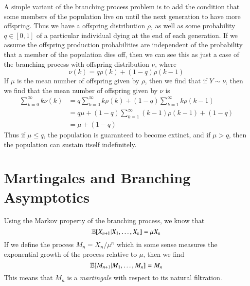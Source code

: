 \begin{example}
    A simple variant of the branching process problem is to add the condition that some members of the population live on until the next generation to have more offspring. Thus we have a offspring distribution $\rho$, as well as some probability $q \in [0,1]$ of a particular individual dying at the end of each generation. If we assume the offspring production probabilities are independent of the probability that a member of the population dies off, then we can see this as just a case of the branching process with offspring distribution $\nu$, where
    \[ \nu(k) = q\rho(k) + (1 - q)\rho(k-1) \]
    If $\mu$ is the mean number of offspring given by $\rho$, then we find that if $Y \sim \nu$, then we find that the mean number of offspring given by $\nu$ is
    \begin{align*}
        \sum_{k = 0}^\infty k \nu(k) &= q \sum_{k = 0}^\infty k \rho(k) + (1 - q) \sum_{k = 1}^\infty k \rho(k-1)\\
        &= q\mu + (1 - q) \sum_{k = 1}^\infty (k-1) \rho(k-1) + (1-q)\\
        &= \mu + (1 - q)
    \end{align*}
    Thus if $\mu \leq q$, the population is guaranteed to become extinct, and if $\mu > q$, then the population can sustain itself indefinitely.
\end{example}

\section{Martingales and Branching Asymptotics}

Using the Markov property of the branching process, we know that
%
\[ \operatorname{\mathbb{E}}[X_{n+1}|X_1, \dots, X_n] = \mu X_n \]
%
If we define the process $M_n = X_n/\mu^n$ which in some sense measures the exponential growth of the process relative to $\mu$, then we find
%
\[ \operatorname{\mathbb{E}}[M_{n+1}|M_1, \dots, M_n] = M_n \]
%
This means that $M_n$ is a {\it martingale} with respect to its natural filtration.

